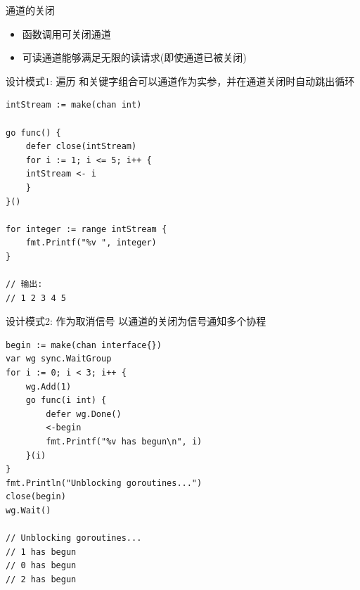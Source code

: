 \begin{frame}{通道的关闭}
    \begin{itemize}
        \item {}函数调用可关闭通道
        \item 可读通道能够满足无限的读请求(即使通道已被关闭)
    \end{itemize}
\end{frame}

\begin{frame}[fragile]{设计模式1: 遍历}
    和关键字组合可以通道作为实参，并在通道关闭时自动跳出循环
\begin{lstlisting}
intStream := make(chan int)

go func() {
    defer close(intStream)
    for i := 1; i <= 5; i++ {
    intStream <- i
    }
}()

for integer := range intStream {
    fmt.Printf("%v ", integer)
}

// 输出:
// 1 2 3 4 5 
\end{lstlisting}    
\end{frame}

\begin{frame}[fragile]{设计模式2: 作为取消信号}
    以通道的关闭为信号通知多个协程
\begin{lstlisting}
begin := make(chan interface{})
var wg sync.WaitGroup
for i := 0; i < 3; i++ {
    wg.Add(1)
    go func(i int) {
        defer wg.Done()
        <-begin
        fmt.Printf("%v has begun\n", i)
    }(i)
}
fmt.Println("Unblocking goroutines...")
close(begin)
wg.Wait()

// Unblocking goroutines...
// 1 has begun
// 0 has begun
// 2 has begun
\end{lstlisting}
\end{frame}

